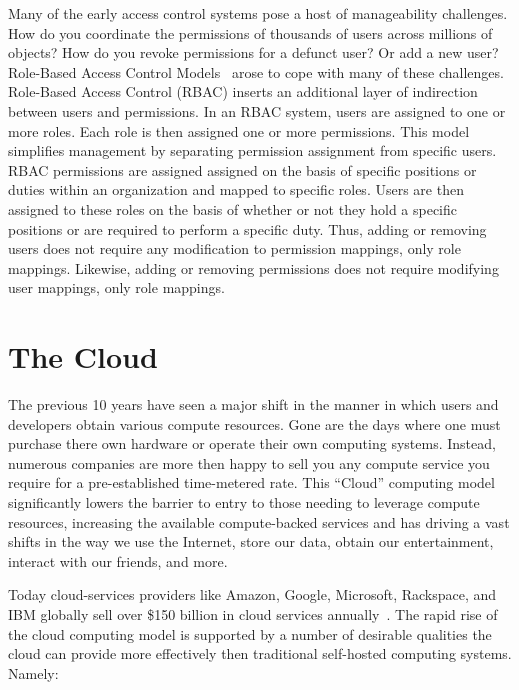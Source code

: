 Many of the early access control systems pose a host of manageability
challenges. How do you coordinate the permissions of thousands of
users across millions of objects? How do you revoke permissions for a
defunct user? Or add a new user?  Role-Based Access Control
Models~\cite{sandhu1996} arose to cope with many of these challenges.
Role-Based Access Control (RBAC) inserts an additional layer of
indirection between users and permissions. In an RBAC system, users
are assigned to one or more roles. Each role is then assigned one or
more permissions. This model simplifies management by separating
permission assignment from specific users. RBAC permissions are
assigned assigned on the basis of specific positions or duties within
an organization and mapped to specific roles. Users are then assigned
to these roles on the basis of whether or not they hold a specific
positions or are required to perform a specific duty. Thus, adding or
removing users does not require any modification to permission
mappings, only role mappings. Likewise, adding or removing permissions
does not require modifying user mappings, only role
mappings.

\section{The Cloud}

The previous 10 years have seen a major shift in the manner in which
users and developers obtain various compute resources. Gone are the
days where one must purchase there own hardware or operate their own
computing systems. Instead, numerous companies are more then happy to
sell you any compute service you require for a pre-established
time-metered rate. This ``Cloud'' computing model significantly lowers
the barrier to entry to those needing to leverage compute resources,
increasing the available compute-backed services and has driving a
vast shifts in the way we use the Internet, store our data, obtain our
entertainment, interact with our friends, and more.

Today cloud-services providers like Amazon, Google, Microsoft,
Rackspace, and IBM globally sell over \$150 billion in cloud services
annually~\cite{flood2013}. The rapid rise of the cloud computing model
is supported by a number of desirable qualities the cloud can provide
more effectively then traditional self-hosted computing
systems. Namely:

